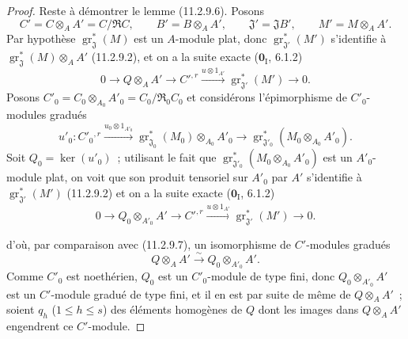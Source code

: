 \begin{proof}
Reste à démontrer le lemme (11.2.9.6). Posons
\[
C'=C\otimes_AA'=C/\mathfrak RC,\qquad
B'=B\otimes_AA',\qquad \mathfrak J'=\mathfrak JB',\qquad
M'=M\otimes_AA'.
\]
Par hypothèse $\operatorname{gr}_{\mathfrak J}^*(M)$ est un $A$-module plat,
donc $\operatorname{gr}_{\mathfrak J'}^*(M')$ s'identifie à
$\operatorname{gr}_{\mathfrak J}^*(M)\otimes_AA'$ (11.2.9.2), et on a la
suite exacte ($\mathbf 0_{\mathrm I}$, 6.1.2)
\begin{equation}
0\longrightarrow Q\otimes_AA'\longrightarrow C'^{,r}
\xrightarrow{u\otimes1_{A'}}\operatorname{gr}_{\mathfrak J'}^*(M')
\longrightarrow0.
\label{IV.11.2.9.7-fr}
\tag{11.2.9.7}
\end{equation}
Posons $C'_0=C_0\otimes_{A_0}A'_0=C_0/\mathfrak R_0C_0$ et considérons
l'épimorphisme de $C'_0$-modules gradués
\[
u'_0:C'_0{}^{,r}\xrightarrow{u_0\otimes1_{A'_0}}
\operatorname{gr}_{\mathfrak J_0}^*(M_0)\otimes_{A_0}A'_0
\longrightarrow
\operatorname{gr}_{\mathfrak J'_0}^*(M_0\otimes_{A_0}A'_0).
\]
Soit $Q_0=\ker(u'_0)$~; utilisant le fait que
$\operatorname{gr}_{\mathfrak J'_0}^*(M_0\otimes_{A_0}A'_0)$ est un
$A'_0$-module plat, on voit que son produit tensoriel sur $A'_0$ par $A'$
s'identifie à $\operatorname{gr}_{\mathfrak J'}^*(M')$ (11.2.9.2) et on a la
suite exacte ($\mathbf 0_{\mathrm I}$, 6.1.2)
\begin{equation}
0\longrightarrow Q_0\otimes_{A'_0}A'\longrightarrow C'^{,r}
\xrightarrow{u\otimes1_{A'}}\operatorname{gr}_{\mathfrak J'}^*(M')
\longrightarrow0.
\label{IV.11.2.9.8-fr}
\tag{11.2.9.8}
\end{equation}


d'où, par comparaison avec (11.2.9.7), un isomorphisme de $C'$-modules
gradués
\[
Q\otimes_AA'\xrightarrow{\sim}Q_0\otimes_{A'_0}A'.
\]
Comme $C'_0$ est noethérien, $Q_0$ est un $C'_0$-module de type fini, donc
$Q_0\otimes_{A'_0}A'$ est un $C'$-module gradué de type fini, et il en est par
suite de même de $Q\otimes_AA'$~; soient $q_h$ ($1\leq h\leq s$) des éléments
homogènes de $Q$ dont les images dans $Q\otimes_AA'$ engendrent ce
$C'$-module.


\end{proof}
